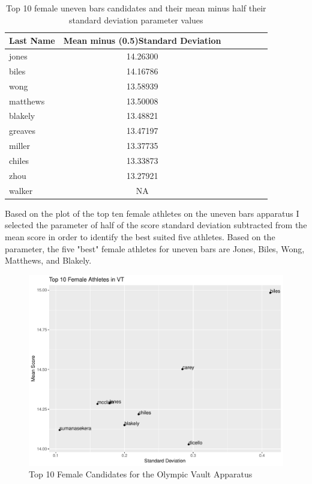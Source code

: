 \documentclass[12pt]{article}
\begin{document}
\begin{table}
  \caption{Top 10 female uneven bars candidates and their mean minus half their standard deviation parameter values}
  \label{tab:tableUBP}
\centering
\begin{tabular}[t]{lccllll}
 \toprule
Last Name & Mean minus (0.5)Standard Deviation\\
\midrule
jones & 14.26300\\
\midrule
biles & 14.16786\\
\midrule
wong & 13.58939\\
\midrule
matthews & 13.50008\\
\midrule
blakely & 13.48821\\
\midrule
greaves & 13.47197\\
\midrule
miller & 13.37735\\
\midrule
chiles & 13.33873\\
\midrule
zhou & 13.27921\\
\midrule
walker & NA\\
\bottomrule
\end{tabular}
\end{table}

Based on the plot of the top ten female athletes on the uneven bars apparatus I selected the parameter of 
half of the score standard deviation subtracted from the mean score in order to identify the best suited five 
athletes. Based on the parameter, the five "best" female athletes for uneven bars are Jones, Biles, Wong, 
Matthews, and Blakely.

\begin{figure}
  \centering
  \includegraphics[scale=0.6]{FemaleAthletesVT.pdf}
  \caption{Top 10 Female Candidates for the Olympic Vault Apparatus}
  \label{fig:VT}
\end{figure}
\end{document}
